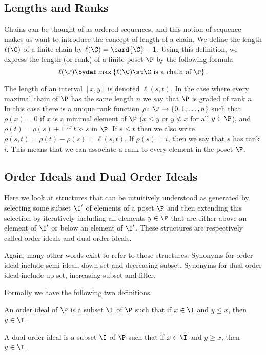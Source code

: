 \subsection{Lengths and Ranks}

Chains can be thought of as ordered sequences, and this notion of sequence makes
us want to introduce the concept of length of a chain. We define the length
$\ell(\C)$ of a finite chain by $\ell(\C) = \card{\C} - 1$. Using this definition, we
express the length (or rank) of a finite poset $\P$ by the following formula
\begin{displaymath}
\ell(\P) \bydef \max\left\{{\ell(\C) \st \C ~\text{is a chain of}~ \P}\right\}.
\end{displaymath}

The length of an interval $[x, y]$ is denoted $\ell(s, t)$. In the case where
every maximal chain of $\P$ has the same length $n$ we say that $\P$ is graded of
rank $n$. In this case there is a unique rank function $\rho \colon\, \P \to \left\{{0,
1, \ldots , n}\right\}$ such that $\rho(x) = 0$ if $x$ is a minimal element of
$\P$ ($x \le y$ or $y \nleq x$ for all $y \in \P$), and $\rho(t) = \rho(s) + 1$
if $t \gtrdot s$ in $\P$. If $s \le t$ then we also write $\rho(s, t) = \rho(t)
- \rho(s) = \ell(s, t)$. If $\rho(s) = i$, then we say that $s$ has rank $i$.
This means that we can associate a rank to every element in the poset $\P$.


\subsection{Order Ideals and Dual Order Ideals}

Here we look at structures that can be intuitively understood as generated by
selecting some subset $\I'$ of elements of a poset $\P$ and then extending this
selection by iteratively including all elements $y \in \P$ that
are either above an element of $\I'$ or below an element of $\I'$. These
structures are respectively called order ideals and dual order ideals.

Again, many other words exist to refer to those structures. Synonyms for
order ideal include semi-ideal, down-set and
decreasing subset. Synonyms for dual order ideal include
up-set, increasing subset and filter.

Formally we have the following two definitions
\begin{definition}
An order ideal of $\P$ is a subset $\I$ of $\P$ such that if $x \in
\I$ and $y \le x$, then $y \in \I$.
\end{definition}
\begin{definition}
A dual order ideal is a subset $\I$ of $\P$ such that if $x \in \I$
and $y \ge x$, then $y \in \I$.
\end{definition}

